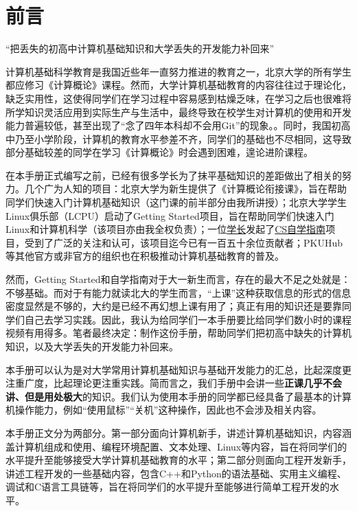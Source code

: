\documentclass[../main.tex]{subfiles}
\begin{document}
\chapter{前言}

\begin{center}
  {\kaishu “把丢失的初高中计算机基础知识和大学丢失的开发能力补回来” }
\end{center}

计算机基础科学教育是我国近些年一直努力推进的教育之一，北京大学的所有学生都应修习《计算概论》课程。然而，大学计算机基础教育的内容往往过于理论化，缺乏实用性，这使得同学们在学习过程中容易感到枯燥乏味，在学习之后也很难将所学知识灵活应用到实际生产与生活中，最终导致在校学生对计算机的使用和开发能力普遍较低，甚至出现了“念了四年本科却不会用Git”的现象。。同时，我国初高中乃至小学阶段，计算机的教育水平参差不齐，同学们的基础也不尽相同，这导致部分基础较差的同学在学习《计算概论》时会遇到困难，遑论进阶课程。

在本手册正式编写之前，已经有很多学长为了抹平基础知识的差距做出了相关的努力。几个广为人知的项目：北京大学为新生提供了《计算概论衔接课》，旨在帮助同学们快速入门计算机基础知识（这门课的前半部分由我所讲授）；北京大学学生Linux俱乐部（LCPU）启动了Getting Started项目，旨在帮助同学们快速入门Linux和计算机科学（该项目亦由我全权负责）；一位\faGithub\href{https://github.com/PKUFlyingPig}{学长}发起了\href{https://csdiy.wiki/}{CS自学指南}项目，受到了广泛的关注和认可，该项目迄今已有一百五十余位贡献者；PKUHub等其他官方或非官方的组织也在积极推动计算机基础教育的普及。

然而，Getting Started和自学指南对于大一新生而言，存在的最大不足之处就是：不够基础。而对于有能力就读北大的学生而言，“上课”这种获取信息的形式的信息密度显然是不够的，大约是已经不再幻想上课有用了；真正有用的知识还是要靠同学们自己去学习实践。因此，我认为给同学们一本手册要比给同学们数小时的课程视频有用得多。笔者最终决定：制作这份手册，帮助同学们把初高中缺失的计算机知识，以及大学丢失的开发能力补回来。

本手册可以认为是对大学常用计算机基础知识与基础开发能力的汇总，比起深度更注重广度，比起理论更注重实践。简而言之，我们手册中会讲一些\textbf{正课几乎不会讲、但是用处极大}的知识。我们认为使用本手册的同学都已经具备了最基本的计算机操作能力，例如“使用鼠标”“关机”这种操作，因此也不会涉及相关内容。

本手册正文分为两部分。第一部分面向计算机新手，讲述计算机基础知识，内容涵盖计算机组成和使用、编程环境配置、文本处理、Linux等内容，旨在将同学们的水平提升至能够接受大学计算机基础教育的水平；第二部分则面向工程开发新手，讲述工程开发的一些基础内容，包含C++和Python的语法基础、实用主义编程、调试和C语言工具链等，旨在将同学们的水平提升至能够进行简单工程开发的水平。
\end{document}
